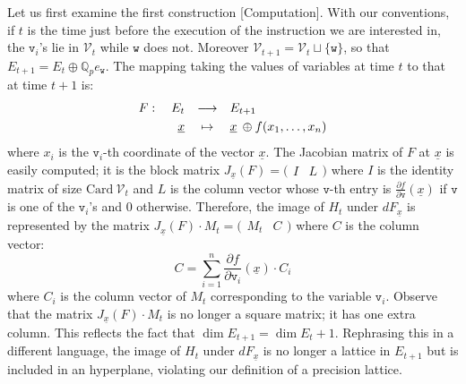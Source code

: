 \documentclass[sigconf]{acmart}
\newcommand{\Q}{\mathbb Q}
\newcommand{\Qp}{\Q_p}
\newcommand{\calV}{\mathcal{V}}
\newcommand{\ttv}{\texttt{v}\xspace}
\newcommand{\ttw}{\texttt{w}\xspace}
\theoremstyle{definition}
\begin{document}
Let us first examine the first construction [Computation].
With our conventions, if $t$ is the time just before the execution of 
the instruction we are interested in, the $\ttv_i$'s lie in $\calV_t$ 
while $\ttw$ does not. Moreover $\calV_{t+1} = \calV_t \sqcup \{\ttw\}$, 
so that $E_{t+1} = E_t \oplus \Qp e_\ttw$.
The mapping taking the values of variables at time $t$ to that at 
time $t{+}1$ is:
$$\begin{array}{rcl}
F: \quad E_t & \longrightarrow & E_{t+1} \smallskip \\
\underline x & \mapsto & \underline x \:\oplus f(x_1, \ldots, x_n)
\end{array}$$
where $x_i$ is the $\ttv_i$-th coordinate of the vector $\underline x$.
The Jacobian matrix of $F$ at $\underline x$ is easily computed; it 
is the block matrix $J_{\underline x}(F) = \big( \begin{matrix} I & L
\end{matrix} \big)$ where $I$ is the identity matrix of size $\text{Card}
\:\calV_t$ and $L$ is the column vector whose $\ttv$-th entry is
$\frac{\partial f}{\partial \ttv} (\underline x)$ if $\ttv$ is one of 
the $\ttv_i$'s and $0$ otherwise.
Therefore, the image of $H_t$ under $dF_{\underline x}$ is represented 
by the matrix $J_{\underline x}(F) \cdot M_t = \big( \begin{matrix} M_t & C
\end{matrix} \big)$ where $C$ is the column vector:
\begin{equation}
\label{eq:defC}
C = \sum_{i=1}^n \frac{\partial f}{\partial{\ttv_i}} (\underline x)
\cdot C_i
\end{equation}
where $C_i$ is the column vector of $M_t$ corresponding to the
variable $\ttv_i$.
Observe that the matrix $J_{\underline x}(F) \cdot M_t$ is no longer a 
square matrix; it has one extra column. This reflects the fact that 
$\dim E_{t+1} = \dim E_t + 1$. Rephrasing this in a different language, 
the image of $H_t$ under $dF_{\underline x}$ is no longer a lattice in 
$E_{t+1}$ but is included in an hyperplane, violating our definition of
a precision lattice.
\end{document}
